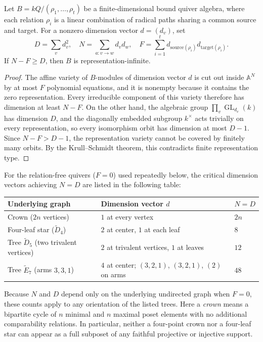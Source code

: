 \begin{lemma}
\label{lem:dimension-infinity}
Let $B=kQ/(\rho_1,\ldots,\rho_t)$ be a finite-dimensional bound quiver algebra, where each relation $\rho_i$ is a linear combination of radical paths sharing a common source and target. For a nonzero dimension vector $d=(d_v)$, set
\[
  D=\sum_v d_v^2,\quad N=\sum_{a:v\to w} d_v d_w,\quad
  F=\sum_{i=1}^t d_{\mathrm{source}(\rho_i)}d_{\mathrm{target}(\rho_i)}.
\]
If $N-F\geq D$, then $B$ is representation-infinite.
\end{lemma}
\begin{proof}
The affine variety of $B$-modules of dimension vector $d$ is cut out inside $\mathbb{A}^N$ by at most $F$ polynomial equations, and it is nonempty because it contains the zero representation. Every irreducible component of this variety therefore has dimension at least $N-F$. On the other hand, the algebraic group $\prod_v\operatorname{GL}_{d_v}(k)$ has dimension $D$, and the diagonally embedded subgroup $k^\times$ acts trivially on every representation, so every isomorphism orbit has dimension at most $D-1$. Since $N-F>D-1$, the representation variety cannot be covered by finitely many orbits. By the Krull--Schmidt theorem, this contradicts finite representation type.
\end{proof}

For the relation-free quivers ($F=0$) used repeatedly below, the critical dimension vectors achieving $N=D$ are listed in the following table:
\begin{center}
\small
\begin{tabular}{@{}lll@{}}
\toprule
Underlying graph & Dimension vector $d$ & $N=D$ \\\midrule
Crown ($2n$ vertices) & $1$ at every vertex & $2n$ \\
Four-leaf star ($\widetilde D_4$) & $2$ at center, $1$ at each leaf & $8$ \\
Tree $\widetilde D_5$ (two trivalent vertices) & $2$ at trivalent vertices, $1$ at leaves & $12$ \\
Tree $\widetilde E_7$ (arms $3,3,1$) & $4$ at center; $(3,2,1)$, $(3,2,1)$, $(2)$ on arms & $48$ \\
\bottomrule
\end{tabular}
\end{center}
Because $N$ and $D$ depend only on the underlying undirected graph when $F=0$, these counts apply to any orientation of the listed trees. Here a \emph{crown} means a bipartite cycle of $n$ minimal and $n$ maximal poset elements with no additional comparability relations. In particular, neither a four-point crown nor a four-leaf star can appear as a full subposet of any faithful projective or injective support.

